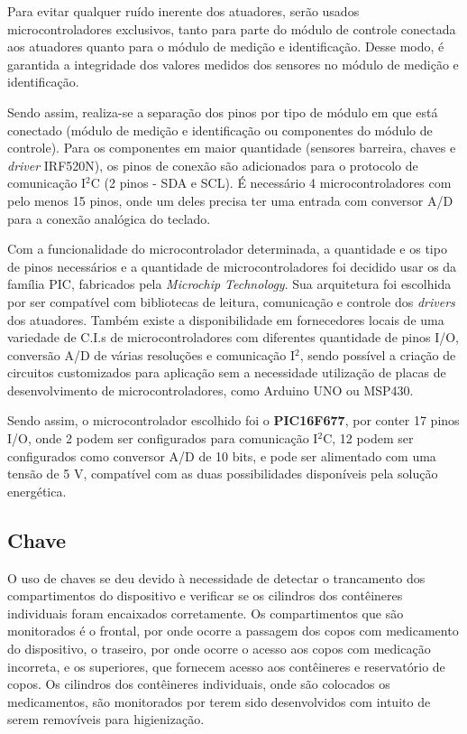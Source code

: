     Para evitar qualquer ruído inerente dos atuadores, serão usados microcontroladores exclusivos, tanto para parte do módulo de controle conectada aos atuadores quanto para o módulo de medição e identificação. Desse modo, é garantida a integridade dos valores medidos dos sensores no módulo de medição e identificação.
    
    Sendo assim, realiza-se a separação dos pinos por tipo de módulo em que está conectado (módulo de medição e identificação ou componentes do módulo de controle). Para os componentes em maior quantidade (sensores barreira, chaves e \textit{driver} IRF520N), os pinos de conexão são adicionados para o protocolo de comunicação I$^2$C (2 pinos - SDA e SCL). É necessário 4 microcontroladores com pelo menos 15 pinos, onde um deles precisa ter uma entrada com conversor A/D para a conexão analógica do teclado. 
    
    Com a funcionalidade do microcontrolador determinada, a quantidade e os tipo de pinos necessários e a quantidade de microcontroladores foi decidido usar os da família PIC, fabricados pela \textit{Microchip Technology}. Sua arquitetura foi escolhida por ser compatível com bibliotecas de leitura, comunicação e controle dos \textit{drivers} dos atuadores. Também existe a disponibilidade em fornecedores locais de uma variedade de C.I.s de microcontroladores com diferentes quantidade de pinos I/O, conversão A/D de várias resoluções e comunicação I$^2$, sendo  possível a criação de circuitos customizados para aplicação sem a necessidade utilização de placas de desenvolvimento de microcontroladores, como Arduino UNO ou MSP430.
    
    Sendo assim, o microcontrolador escolhido foi o \textbf{PIC16F677}, por conter 17 pinos I/O, onde 2 podem ser configurados para comunicação I$^2$C, 12 podem ser configurados como conversor A/D de 10 bits, e pode ser alimentado com uma tensão de 5 V, compatível com as duas possibilidades disponíveis pela solução energética.

\subsection{Chave}
    
    O uso de chaves se deu devido à necessidade de detectar o trancamento dos compartimentos do dispositivo e verificar se os cilindros dos contêineres individuais foram encaixados corretamente. Os compartimentos que são monitorados é o frontal, por onde ocorre a passagem dos copos com medicamento do dispositivo, o traseiro, por onde ocorre o acesso aos copos com medicação incorreta, e os superiores, que fornecem acesso aos contêineres e reservatório de copos. Os cilindros dos contêineres individuais, onde são colocados os medicamentos, são monitorados por terem sido desenvolvidos com intuito de serem removíveis para higienização.
    
